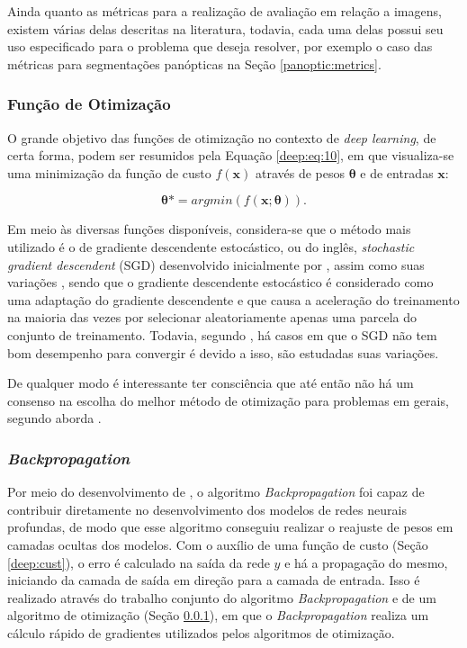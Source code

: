 Ainda quanto as métricas para a realização de avaliação em relação a imagens, existem várias delas descritas na literatura, todavia,  cada uma delas possui seu uso especificado para o problema que deseja resolver, por exemplo o caso das métricas para segmentações panópticas na Seção \ref{panoptic:metrics}.


\subsubsection{Função de Otimização}
\label{deep:optimization}

O grande objetivo das funções de otimização no contexto de \textit{deep learning}, de certa forma, podem ser resumidos pela Equação \ref{deep:eq:10}, em que visualiza-se uma minimização da função de custo $f(\boldsymbol{x})$ através de pesos $\boldsymbol{\theta}$ e de entradas $\boldsymbol{x}$:

\begin{equation}
    \label{deep:eq:10}
    \boldsymbol{\theta}* = argmin(f(\boldsymbol{x};\boldsymbol{\theta})).
\end{equation}

Em meio às diversas funções disponíveis, considera-se que o método mais utilizado é o de gradiente descendente estocástico, ou do inglês, \textit{stochastic gradient descendent} (SGD) desenvolvido inicialmente por \cite{cauchy1847methode}, assim como suas variações \cite{Goodfellow2016}, sendo que o gradiente descendente estocástico é considerado como uma adaptação do gradiente descendente e que causa a aceleração do treinamento na maioria das vezes por selecionar aleatoriamente apenas uma parcela do conjunto de treinamento. Todavia, segundo \cite{Goodfellow2016}, há casos em que o SGD não tem bom desempenho para convergir é devido a isso, são estudadas suas variações.

De qualquer modo é interessante ter consciência que até então não há um consenso na escolha do melhor método de otimização para problemas em gerais, segundo aborda \cite{Goodfellow2016}.

\subsubsection{\textit{Backpropagation}}
\label{deep:backprop}

Por meio do desenvolvimento de \cite{rumelhart1986learning}, o algoritmo \textit{Backpropagation} foi capaz de contribuir diretamente no desenvolvimento dos modelos de redes neurais profundas, de modo que esse algoritmo conseguiu realizar o reajuste de pesos em camadas ocultas dos modelos. Com o auxílio de uma função de custo (Seção
\ref{deep:cust}), o erro é calculado na saída da rede $y$ e há a propagação do mesmo, iniciando da camada de saída em direção para a camada de entrada. Isso é realizado através do trabalho conjunto do algoritmo \textit{Backpropagation} e de um algoritmo de otimização (Seção \ref{deep:optimization}), em que o \textit{Backpropagation} realiza um cálculo rápido de gradientes utilizados pelos algoritmos de otimização.

